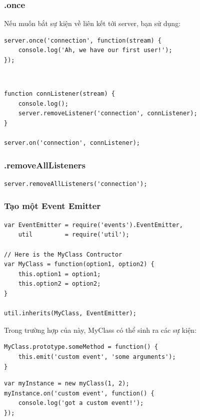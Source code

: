 			
		\subsubsection{.once}
Nếu muốn bắt sự kiện về  liên kết tới server, bạn sử dụng: 
			\begin{verbatim}
server.once('connection', function(stream) {
	console.log('Ah, we have our first user!');
});
			\end{verbatim}
		
\\	
			\begin{verbatim}
function connListener(stream) {
	console.log();
	server.removeListener('connection', connListener);
}

server.on('connection', connListener);
			\end{verbatim}
		
		\subsubsection{.removeAllListeners}
			\begin{verbatim}
server.removeAllListeners('connection');
			\end{verbatim}
		

\subsubsection{Tạo một Event Emitter}
			\begin{verbatim}
var EventEmitter = require('events').EventEmitter,
	util 		 = require('util');

// Here is the MyClass Contructor
var MyClass = function(option1, option2) {
	this.option1 = option1;
	this.option2 = option2;
}

util.inherits(MyClass, EventEmitter);
			\end{verbatim}
			
	Trong trường hợp của này, MyClass có thể sinh ra các sự kiện:\\
	\begin{verbatim}
MyClass.prototype.someMethod = function() {
	this.emit('custom event', 'some arguments');
}
	\end{verbatim}
	
	\begin{verbatim}
var myInstance = new myClass(1, 2);
myInstance.on('custom event', function() {
	console.log('got a custom event!');
});
	\end{verbatim}
